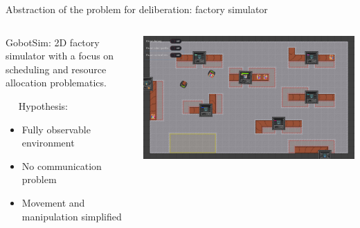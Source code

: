 \begin{frame}{Abstraction of the problem for deliberation: factory simulator}
    \begin{columns}
        \begin{column}{0.6\textwidth}
            GobotSim: 2D factory simulator with a focus on scheduling and resource allocation problematics.

            ~~
            \pause
            Hypothesis:
            \begin{itemize}
                \item Fully observable environment
                \item No communication problem
                \item Movement and manipulation simplified
            \end{itemize}
        \end{column}
        \begin{column}{0.4\textwidth}
            \includegraphics[width=\linewidth]{images/gobot-rae.png}
        \end{column}
    \end{columns}
\end{frame}

